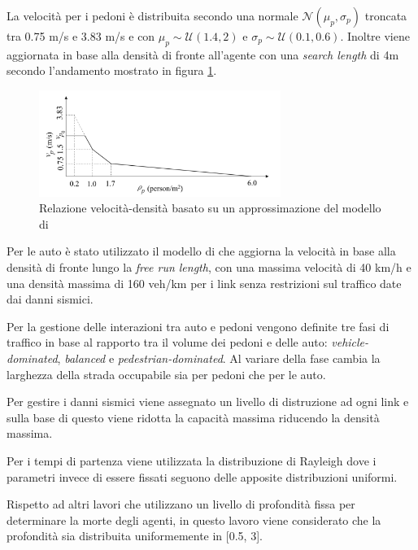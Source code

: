 La velocità per i pedoni è distribuita secondo una normale $\mathcal{N}(\mu_p,\sigma_p)$ troncata tra 0.75 m/s e 3.83 m/s e
con $\mu_p \sim \mathcal{U}(1.4, 2)$ e $\sigma_p \sim \mathcal{U}(0.1, 0.6)$.
Inoltre viene aggiornata in base alla densità di fronte all'agente con una \textit{search length} di 4m secondo l'andamento mostrato in figura \ref{fig:wang2021}.

\begin{figure}[ht]
    \centering
    \includegraphics[width=0.7\textwidth]{images/speed_WANG.png}
    \caption{Relazione velocità-densità \textcite{wang2021novel} basato su un approssimazione del modello di \textcite{goto2012tsunami}}
    \label{fig:wang2021}
\end{figure}

Per le auto è stato utilizzato il modello di \textcite{greenshields1935study} che aggiorna la velocità in base alla densità di fronte lungo la \textit{free run length},
con una massima velocità di 40 km/h e una densità massima di 160 veh/km per i link senza restrizioni sul traffico date dai danni sismici.

Per la gestione delle interazioni tra auto e pedoni vengono definite tre fasi di traffico in base al rapporto
tra il volume dei pedoni e delle auto: \textit{vehicle-dominated}, \textit{balanced} e \textit{pedestrian-dominated}.
Al variare della fase cambia la larghezza della strada occupabile sia per pedoni che per le auto.

Per gestire i danni sismici viene assegnato un livello di distruzione ad ogni link e sulla base di questo viene 
ridotta la capacità massima riducendo la densità massima.

Per i tempi di partenza viene utilizzata la distribuzione di Rayleigh dove i parametri
invece di essere fissati seguono delle apposite distribuzioni uniformi.

Rispetto ad altri lavori che utilizzano un livello di profondità fissa per determinare la morte degli agenti, in questo lavoro
viene considerato che la profondità sia distribuita uniformemente in [0.5, 3]. 
